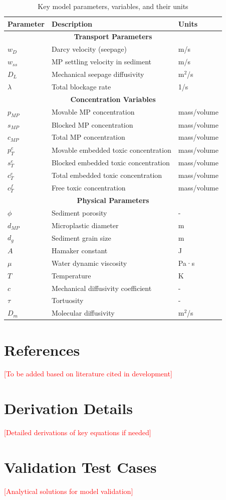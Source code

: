 \documentclass[11pt,a4paper]{article}
\begin{document}
\begin{table}[h!]
\centering
\begin{tabular}{@{}lll@{}}
\toprule
\textbf{Parameter} & \textbf{Description} & \textbf{Units} \\
\midrule
\multicolumn{3}{c}{\textbf{Transport Parameters}} \\
\midrule
$w_D$ & Darcy velocity (seepage) & m/s \\
$w_{ss}$ & MP settling velocity in sediment & m/s \\
$D_L$ & Mechanical seepage diffusivity & m$^2$/s \\
$\lambda$ & Total blockage rate & 1/s \\
\midrule
\multicolumn{3}{c}{\textbf{Concentration Variables}} \\
\midrule
$p_{MP}$ & Movable MP concentration & mass/volume \\
$s_{MP}$ & Blocked MP concentration & mass/volume \\
$c_{MP}$ & Total MP concentration & mass/volume \\
$p_T^e$ & Movable embedded toxic concentration & mass/volume \\
$s_T^e$ & Blocked embedded toxic concentration & mass/volume \\
$c_T^e$ & Total embedded toxic concentration & mass/volume \\
$c_T^f$ & Free toxic concentration & mass/volume \\
\midrule
\multicolumn{3}{c}{\textbf{Physical Parameters}} \\
\midrule
$\phi$ & Sediment porosity & - \\
$d_{MP}$ & Microplastic diameter & m \\
$d_g$ & Sediment grain size & m \\
$A$ & Hamaker constant & J \\
$\mu$ & Water dynamic viscosity & Pa·s \\
$T$ & Temperature & K \\
$c$ & Mechanical diffusivity coefficient & - \\
$\tau$ & Tortuosity & - \\
$D_m$ & Molecular diffusivity & m$^2$/s \\
\bottomrule
\end{tabular}
\caption{Key model parameters, variables, and their units}
\label{tab:parameters}
\end{table}

\section{References}

\textcolor{red}{[To be added based on literature cited in development]}

\appendix

\section{Derivation Details}

\textcolor{red}{[Detailed derivations of key equations if needed]}

\section{Validation Test Cases}

\textcolor{red}{[Analytical solutions for model validation]}
\end{document}
